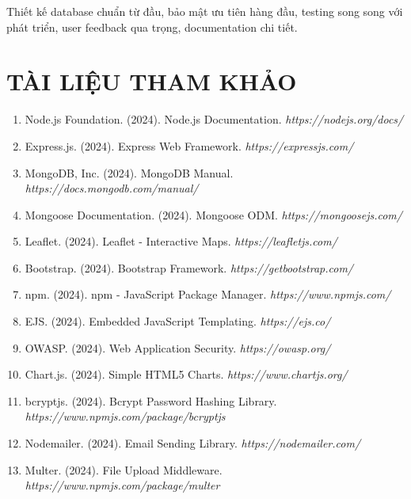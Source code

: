 \documentclass[12pt,a4paper]{article}
\begin{document}
Thiết kế database chuẩn từ đầu, bảo mật ưu tiên hàng đầu, testing song song với phát triển, user feedback qua trọng, documentation chi tiết.

\newpage
\section{TÀI LIỆU THAM KHẢO}

\begin{enumerate}

\item Node.js Foundation. (2024). Node.js Documentation. 
  \textit{https://nodejs.org/docs/}

\item Express.js. (2024). Express Web Framework. 
  \textit{https://expressjs.com/}

\item MongoDB, Inc. (2024). MongoDB Manual. 
  \textit{https://docs.mongodb.com/manual/}

\item Mongoose Documentation. (2024). Mongoose ODM. 
  \textit{https://mongoosejs.com/}

\item Leaflet. (2024). Leaflet - Interactive Maps. 
  \textit{https://leafletjs.com/}

\item Bootstrap. (2024). Bootstrap Framework. 
  \textit{https://getbootstrap.com/}

\item npm. (2024). npm - JavaScript Package Manager. 
  \textit{https://www.npmjs.com/}

\item EJS. (2024). Embedded JavaScript Templating. 
  \textit{https://ejs.co/}

\item OWASP. (2024). Web Application Security. 
  \textit{https://owasp.org/}

\item Chart.js. (2024). Simple HTML5 Charts. 
  \textit{https://www.chartjs.org/}

\item bcryptjs. (2024). Bcrypt Password Hashing Library. 
  \textit{https://www.npmjs.com/package/bcryptjs}

\item Nodemailer. (2024). Email Sending Library. 
  \textit{https://nodemailer.com/}

\item Multer. (2024). File Upload Middleware. 
  \textit{https://www.npmjs.com/package/multer}


\end{enumerate}
\end{document}
